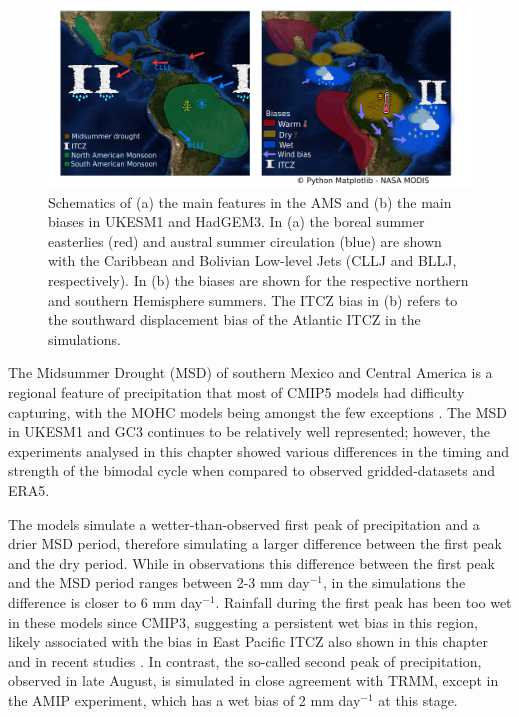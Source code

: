 \begin{figure}[t!]
\centering
 \includegraphics[width=\linewidth]{figures/drawing_d}
\caption[Summary schematic of biases in UKESM1 and HadGEM3]{Schematics of (a) the main features in the AMS and (b) the main biases in UKESM1 and HadGEM3. In (a) the boreal summer easterlies (red) and austral summer circulation (blue) are shown with the Caribbean and Bolivian Low-level Jets (CLLJ and BLLJ, respectively). In (b) the biases are shown for the respective northern and southern Hemisphere summers. The ITCZ bias in (b) refers to the southward displacement bias of the Atlantic ITCZ in the simulations.  }
\label{fig:13}
\end{figure}

    The Midsummer Drought (MSD) of southern Mexico and Central America is a regional feature of precipitation that most of CMIP5 models had difficulty capturing, with the MOHC models being amongst the few exceptions \citep{ryu2014}. 
The MSD in UKESM1 and GC3 continues to be relatively well represented; however, the experiments analysed in this chapter showed various  differences in the timing and strength of the bimodal cycle when compared to observed gridded-datasets and ERA5.  

The models simulate a wetter-than-observed first peak of precipitation and a drier MSD period, therefore simulating a larger difference between the first peak and the dry period. While in observations this difference  between the first peak and the MSD period ranges between 2-3 mm day$^{-1}$, in the simulations the difference is closer to 6 mm day$^{-1}$.
Rainfall during the first peak has been too wet in these models since CMIP3, suggesting a persistent wet bias in this region, likely associated with the bias in East Pacific ITCZ also shown in this chapter and in recent studies \citep{ryu2014,mulcahy2018}. 
In contrast, the so-called second peak of precipitation, observed in late August, is simulated in close agreement with TRMM, except in the AMIP experiment, which has a wet bias of 2 mm day$^{-1}$ at this stage.

